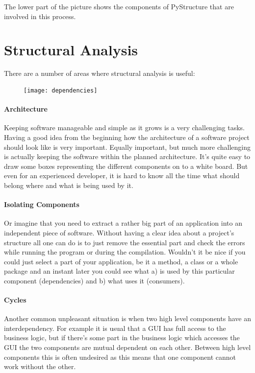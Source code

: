\documentclass[12pt,halfparskip,DIV11,BCOR10mm]{scrreprt}
\begin{document}
The lower part of the picture shows the components of PyStructure that are involved in this process. %


\section{Structural Analysis}

There are a number of areas where structural analysis is useful:

\begin{figure}
    \vspace{-0.3cm}
    \texttt{[image: dependencies]}
    \vspace{-1cm}
\end{figure}

\paragraph{Architecture}
Keeping software manageable and simple as it grows is a very challenging tasks. Having a good idea from the beginning how the architecture of a software project should look like is very important. Equally important, but much more challenging is actually keeping the software within the planned architecture. It's quite easy to draw some boxes representing the different components on to a white board. But even for an experienced developer, it is hard to know all the time what should belong where and what is being used by it.

\paragraph{Isolating Components}
Or imagine that you need to extract a rather big part of an application into an independent piece of software. Without having a clear idea about a project's structure all one can do is to just remove the essential part and check the errors while running the program or during the compilation. Wouldn't it be nice if you could just select a part of your application, be it a method, a class or a whole package and an instant later you could see what a) is used by this particular component (dependencies) and b) what uses it (consumers).

\paragraph{Cycles}
Another common unpleasant situation is when two high level components have an interdependency. For example it is usual that a GUI has full access to the business logic, but if there's some part in the business logic which accesses the GUI the two components are mutual dependent on each other. Between high level components this is often undesired as this means that one component cannot work without the other.
\end{document}
